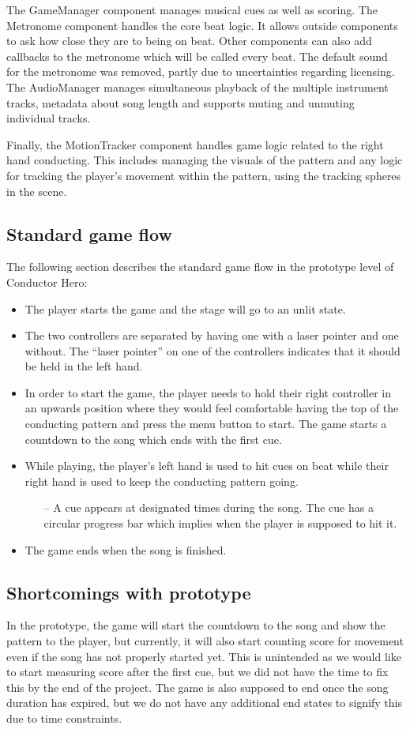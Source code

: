The GameManager component manages musical cues as well as scoring. The Metronome component handles the core beat logic. It allows outside components to ask how close they are to being on beat. Other components can also add callbacks to the metronome which will be called every beat. The default sound for the metronome was removed, partly due to uncertainties regarding licensing. The AudioManager manages simultaneous playback of the multiple instrument tracks, metadata about song length and supports muting and unmuting individual tracks. 

Finally, the MotionTracker component handles game logic related to the right hand conducting. This includes managing the visuals of the pattern and any logic for tracking the player’s movement within the pattern, using the tracking spheres in the scene.  

\subsection{Standard game flow} 
The following section describes the standard game flow in the prototype level of Conductor Hero:
\begin{itemize}
\item The player starts the game and the stage will go to an unlit state.  
\item The two controllers are separated by having one with a laser pointer and one without. The “laser pointer” on one of the controllers indicates that it should be held in the left hand.
\item In order to start the game, the player needs to hold their right controller in an upwards position where they would feel comfortable having the top of the conducting pattern and press the menu button to start. 
The game starts a countdown to the song which ends with the first cue.
\item While playing, the player’s left hand is used to hit cues on beat while their right hand is used to keep the conducting pattern going. 
    \begin{itemize}
    \item[--] A cue appears at designated times during the song. The cue has a circular progress bar which implies when the player is supposed to hit it.
    \end{itemize}
\item The game ends when the song is finished.
\end{itemize}

\subsection{Shortcomings with prototype}
In the prototype, the game will start the countdown to the song and show the pattern to the player, but currently, it will also start counting score for movement even if the song has not properly started yet. This is unintended as we would like to start measuring score after the first cue, but we did not have the time to fix this by the end of the project. The game is also supposed to end once the song duration has expired, but we do not have any additional end states to signify this due to time constraints.  


